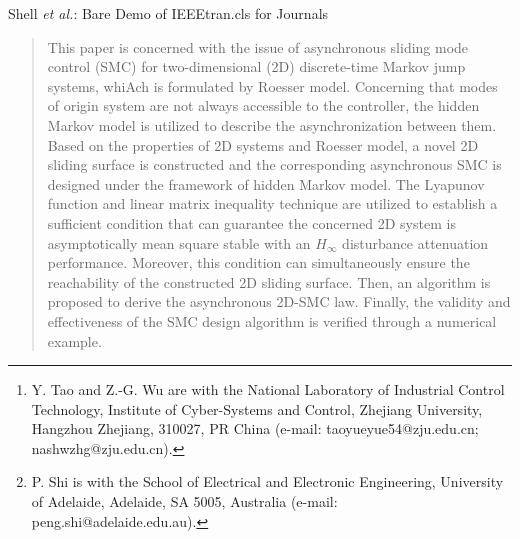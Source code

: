 \documentclass[journal,final,twocolumn]{IEEEtran}
\begin{document}

\author{Yue-Yue Tao, Zheng-Guang Wu, and Peng Shi
	\thanks{Y. Tao and Z.-G. Wu are with the National Laboratory of Industrial Control Technology, Institute of Cyber-Systems and Control, Zhejiang University, Hangzhou Zhejiang, 310027, PR China (e-mail: taoyueyue54@zju.edu.cn; nashwzhg@zju.edu.cn).}
	\thanks{P. Shi is with the School of Electrical and Electronic Engineering, University of Adelaide, Adelaide, SA 5005, Australia (e-mail: peng.shi@adelaide.edu.au). }  
}

%
{Shell \MakeLowercase{\textit{et al.}}: Bare Demo of IEEEtran.cls for Journals}

\maketitle



\begin{abstract}
	This paper is concerned with the issue of asynchronous sliding mode control (SMC) for two-dimensional (2D) discrete-time Markov jump systems, whiAch is formulated by Roesser model. Concerning that modes of origin system are not always accessible to the controller, the hidden Markov model is utilized to describe the asynchronization between them. Based on the properties of 2D systems and Roesser model, a novel 2D sliding surface is constructed and the corresponding asynchronous SMC is designed under the framework of hidden Markov model. The Lyapunov function and linear matrix inequality technique are utilized to establish a sufficient condition that can guarantee the concerned 2D system is asymptotically mean square stable with an  $H_{\infty}$ disturbance attenuation performance. Moreover, this condition can  simultaneously ensure the reachability of the constructed 2D sliding surface. Then, an algorithm is proposed to derive the asynchronous 2D-SMC law.  Finally, the validity and effectiveness of the  SMC design algorithm is verified through a numerical example.
\end{abstract}
\end{document}
